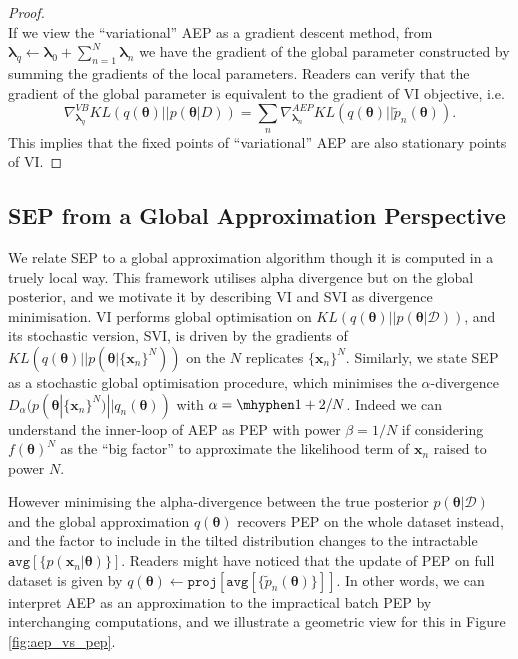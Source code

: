 \documentclass{article} %
\begin{document}
\begin{proof}
\begin{equation}
\end{equation}
If we view the ``variational'' AEP as a gradient descent method, from $\bm{\lambda}_q \leftarrow \bm{\lambda}_0 + \sum_{n=1}^N \bm{\lambda}_n$ we have the gradient of the global parameter constructed by summing the gradients of the local parameters. Readers can verify that the gradient of the global parameter is equivalent to the gradient of VI objective, i.e.
\begin{equation}
\nabla_{\bm{\lambda}_q}^{VB} KL(q(\bm{\theta}) || p(\bm{\theta} | D)) = \sum_n \nabla_{\bm{\lambda}_n}^{AEP} KL(q(\bm{\theta}) || \tilde{p}_n(\bm{\theta})).
\end{equation}
This implies that the fixed points of ``variational'' AEP are also stationary points of VI.
\end{proof}

%
\subsection{SEP from a Global Approximation Perspective}
We relate SEP to a global approximation algorithm though it is computed in a truely local way. This framework utilises alpha divergence but on the global posterior, and we motivate it by describing VI and SVI as divergence minimisation.
%
VI performs global optimisation on $KL(q(\bm{\theta})||p(\bm{\theta}|\mathcal{D}))$, and its stochastic version, SVI, is driven by the gradients of $KL(q(\bm{\theta}) || p(\bm{\theta} | \{\bm{x}_n\}^N))$ on the $N$ replicates $\{\bm{x}_n\}^N$. Similarly, we state SEP as a stochastic global optimisation procedure, which minimises the $\alpha$-divergence $D_{\alpha}(p(\bm{\theta} | \{\bm{x}_n\}^N) || q_n(\bm{\theta}))$ with $\alpha = \mhyphen 1 + 2/N$. Indeed we can understand the inner-loop of AEP as PEP with power $\beta = 1/N$ if considering $f(\bm{\theta})^N$ as the ``big factor'' to approximate the likelihood term of $\bm{x}_n$ raised to power $N$.

However minimising the alpha-divergence between the true posterior $p(\bm{\theta}|\mathcal{D})$ and the global approximation $q(\bm{\theta})$ recovers PEP on the whole dataset instead, and the factor to include in the tilted distribution changes to the intractable $\mathtt{avg}[\{p(\bm{x}_n | \bm{\theta}) \}]$. Readers might have noticed that the update of PEP on full dataset is given by $q(\bm{\theta}) \leftarrow \mathtt{proj}[\mathtt{avg}[\{ \tilde{p}_n(\bm{\theta}) \}]]$. In other words, we can interpret AEP as an approximation to the impractical batch PEP by interchanging computations, and we illustrate a geometric view for this in Figure \ref{fig:aep_vs_pep}.
\end{document}
